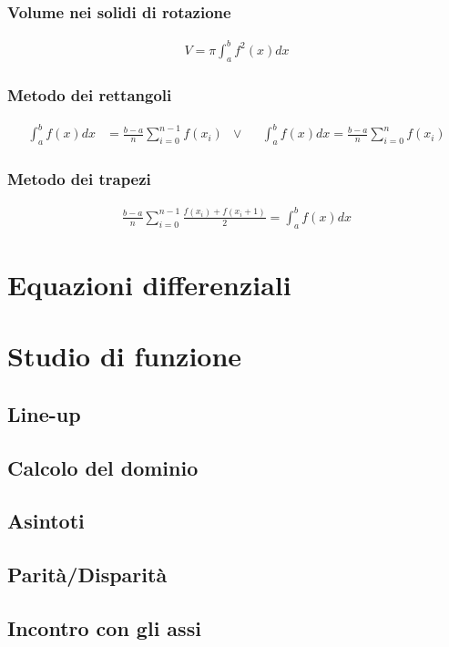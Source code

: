 \documentclass[a4paper]{article}
\begin{document}
	\subsubsection*{Volume nei solidi di rotazione}
	\begin{align*}
		V =\pi \int_{a}^{b} f^2(x)dx
	\end{align*}
	
	\subsubsection*{Metodo dei rettangoli}
	\begin{align*}
		\int_{a}^{b}f(x)dx &= \frac{b-a}{n}\sum_{i=0}^{n-1}f(x_i)		&\vee&	&	\int_{a}^{b} f(x)dx =\frac{b-a}{n}\sum_{i=0}^{n} f(x_i)		
	\end{align*}
	
	\subsubsection*{Metodo dei trapezi}
	\begin{align*}
		\frac{b-a}{n}\sum_{i=0}^{n-1}\frac{f(x_i)+f(x_i + 1)}{2} = \int_{a}^{b} f(x)dx
	\end{align*}
	\newpage
	\section{Equazioni differenziali}
	\newpage
	\section{Studio di funzione}
		\subsection{Line-up}
		\subsection{Calcolo del dominio}
		\subsection{Asintoti}
		\subsection{Parità/Disparità}
		\subsection{Incontro con gli assi}
\end{document}
